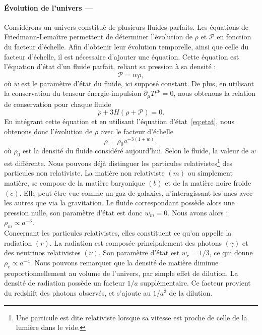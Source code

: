 \documentclass[11pt, twoside, a4paper, openright]{report}
\begin{document}
\paragraph{Évolution de l'univers —}
Considérons un univers constitué de plusieurs fluides parfaits. Les équations de Friedmann-Lemaître permettent de déterminer l'évolution de $\rho$ et $\mathcal{P}$ en fonction du facteur d'échelle. Afin d'obtenir leur évolution temporelle, ainsi que celle du facteur d'échelle, il est nécessaire d'ajouter une équation. Cette équation est l'équation d'état d'un fluide parfait, reliant sa pression à sa densité :
\begin{equation}
  \label{eq:etat}
  \mathcal{P} = w \rho,
\end{equation}
où $w$ est le paramètre d'état du fluide, ici supposé constant.
De plus, en utilisant la conservation du tenseur énergie-impulsion $\partial_{\mu} T^{\mu \nu} = 0$, nous obtenons la relation de conservation pour chaque fluide
\begin{equation}
  \label{eq:conservation}
  \dot{\rho} + 3 H (\rho + \mathcal{P}) = 0 .
\end{equation}
En intégrant cette équation et en utilisant l'équation d'état~\ref{eq:etat}, nous obtenons donc l'évolution de $\rho$ avec le facteur d'échelle
\begin{equation}
  \label{eq:rho_vs_a}
  \rho = \rho_0 a^{-3(1+w)} ,
\end{equation}
où $\rho_0$ est la densité du fluide considéré aujourd'hui.
Selon le fluide, la valeur de $w$ est différente. Nous pouvons déjà distinguer les particules relativistes\footnote{Une particule est dite relativiste lorsque sa vitesse est proche de celle de la lumière dans le vide.} des particules non relativiste. La matière non relativiste $(m)$ ou simplement matière, se compose de la matière baryonique $(b)$ et de la matière noire froide $(c)$.
Elle peut être vue comme un gaz de galaxies, n'interagissant les unes avec les autres que via la gravitation. Le fluide correspondant possède alors une pression nulle, son paramètre d'état est donc $w_m = 0$. Nous avons alors : $\rho_m \propto a^{-3}$. \\
Concernant les particules relativistes, elles constituent ce qu'on appelle la radiation $(r)$. La radiation est composée principalement des photons $(\gamma)$ et des neutrinos relativistes $(\nu)$. Son paramètre d'état est $w_r = 1/3$, ce qui donne $\rho_r \propto a^{-4}$. Nous pouvons remarquer que la densité de matière diminue proportionnellement au volume de l'univers, par simple effet de dilution. La densité de radiation possède un facteur $1/a$ supplémentaire. Ce facteur provient du redshift des photons observés, et s'ajoute au $1/a^3$ de la dilution.
\end{document}

